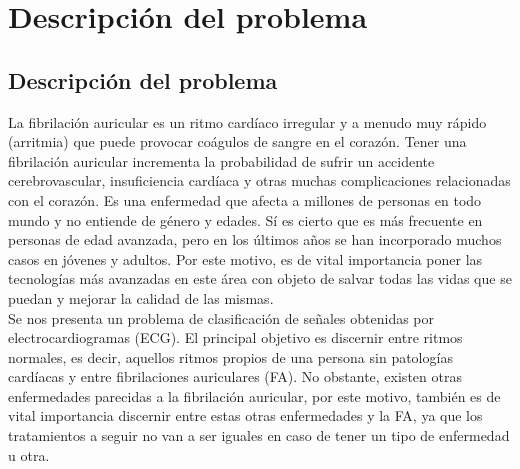 



\chapter{Descripción del problema}\label{ch:descripcion_problema}

\section{Descripción del problema}

    La fibrilación auricular es un ritmo cardíaco irregular y a menudo muy rápido (arritmia) que puede provocar coágulos de sangre en el corazón. Tener una fibrilación auricular incrementa la probabilidad de sufrir un accidente cerebrovascular, insuficiencia cardíaca y otras muchas complicaciones relacionadas con el corazón. Es una enfermedad que afecta a millones de personas en todo mundo y no entiende de género y edades. Sí es cierto que es más frecuente en personas de edad avanzada, pero en los últimos años se han incorporado muchos casos en jóvenes y adultos. Por este motivo, es de vital importancia poner las tecnologías más avanzadas en este área con objeto de salvar todas las vidas que se puedan y mejorar la calidad de las mismas. \\
    
    Se nos presenta un problema de clasificación de señales obtenidas por electrocardiogramas (ECG). El principal objetivo es discernir entre ritmos normales, es decir, aquellos ritmos propios de una persona sin patologías cardíacas y entre fibrilaciones auriculares (FA). No obstante, existen otras enfermedades parecidas a la fibrilación auricular, por este motivo, también es de vital importancia discernir entre estas otras enfermedades y la FA, ya que los tratamientos a seguir no van a ser iguales en caso de tener un tipo de enfermedad u otra. \\
    
